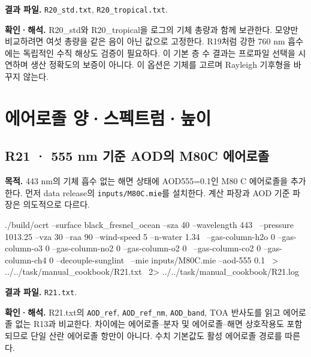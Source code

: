 \textbf{결과 파일. }\texttt{R20\_\allowbreak{}std.txt}, \texttt{R20\_\allowbreak{}tropical.txt}.

\textbf{확인·해석. }R20\_std와 R20\_tropical을 로그의 기체 총량과 함께 보관한다. 모양만 비교하려면 여섯 총량을 같은 음이 아닌 값으로 고정한다. R19처럼 강한 760 nm 흡수에는 독립적인 수직 해상도 검증이 필요하다. 이 기본 층 수 결과는 프로파일 선택을 시연하며 생산 정확도의 보증이 아니다. 이 옵션은 기체를 고르며 Rayleigh 기후형을 바꾸지 않는다.

\section{에어로졸 양·스펙트럼·높이}
\label{sec:auto:09_cookbook:5}


\subsection{R21 · 555 nm 기준 AOD의 M80C 에어로졸}
\label{sec:auto:09_cookbook:5.1}

\label{recipe:R21}

\textbf{목적. }443 nm의 기체 흡수 없는 해면 상태에 AOD555=0.1인 M80 C 에어로졸을 추가한다. 먼저 data release의 \texttt{inputs/\allowbreak{}M80C.mie}를 설치한다. 계산 파장과 AOD 기준 파장은 의도적으로 다르다.

\noindent\begin{minipage}{\linewidth}
\begin{ManualCode}

./build/ocrt --surface black_fresnel_ocean --sza 40 --wavelength 443 \
  --pressure 1013.25 --vza 30 --raa 90 --wind-speed 5 --n-water 1.34 \
  --gas-column-h2o 0 --gas-column-o3 0 --gas-column-no2 0 --gas-column-o2 0 \
  --gas-column-co2 0 --gas-column-ch4 0 --decouple-sunglint \
  --mie inputs/M80C.mie --aod-555 0.1 \
  > ../../task/manual_cookbook/R21.txt \
  2> ../../task/manual_cookbook/R21.log

\end{ManualCode}
\end{minipage}\par

\textbf{결과 파일. }\texttt{R21.txt}.

\textbf{확인·해석. }R21.txt의 \texttt{AOD\_\allowbreak{}ref}, \texttt{AOD\_\allowbreak{}ref\_\allowbreak{}nm}, \texttt{AOD\_\allowbreak{}band}, TOA 반사도를 읽고 에어로졸 없는 R13과 비교한다. 차이에는 에어로졸–분자 및 에어로졸–해면 상호작용도 포함되므로 단일 산란 에어로졸 항만이 아니다. 수치 기본값도 활성 에어로졸 경로를 따른다.

